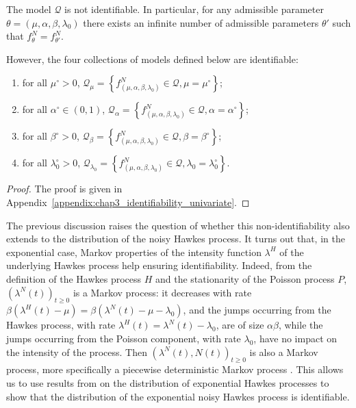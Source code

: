         \begin{proposition}\label{prop:chap3_fixed_univariate_identifiability}
        	The model $\mathcal{Q}$ is not identifiable.
        	In particular, for any admissible parameter $\theta = (\mu, \alpha, \beta, \lambda_0)$ there exists an infinite number of admissible parameters $\theta'$ such that $f_{\theta}^N = f_{\theta'}^N$.
        	
        	However, the four collections of models defined below are identifiable:
          \begin{enumerate}
            \item for all $\mu^\circ > 0$, $\mathcal Q_{\mu} = \left\{ f_{(\mu, \alpha, \beta, \lambda_0)}^N \in \mathcal Q, \mu = \mu^\circ \right\}$;
            \item for all $\alpha^\circ \in (0, 1)$, $\mathcal Q_{\alpha} = \left\{ f_{(\mu, \alpha, \beta, \lambda_0)}^N \in \mathcal Q, \alpha = \alpha^\circ \right\}$;
            \item for all $\beta^\circ > 0$, $\mathcal Q_{\beta} = \left\{ f_{(\mu, \alpha, \beta, \lambda_0)}^N \in \mathcal Q, \beta = \beta^\circ \right\}$;
            \item for all $\lambda_0^\circ > 0$, $\mathcal Q_{\lambda_0} = \left\{ f_{(\mu, \alpha, \beta, \lambda_0)}^N \in \mathcal Q, \lambda_0 = \lambda_0^\circ \right\}$.
          \end{enumerate}
        \end{proposition}
        \begin{proof}
	        The proof is given in Appendix~\ref{appendix:chap3_identifiability_univariate}.
        \end{proof}
        
        The previous discussion raises the question of whether this non-identifiability also extends to the distribution of the noisy Hawkes process.
It turns out that, in the exponential case, Markov properties of the intensity function $\lambda^H$ of the underlying Hawkes process help ensuring identifiability.
Indeed, from the definition of the Hawkes process $H$ and the stationarity of the Poisson process $P$, $\left( \lambda^N(t) \right)_{t \ge 0}$ is a Markov process: it decreases with rate $\beta(\lambda^H(t) - \mu) = \beta (\lambda^N(t) - \mu - \lambda_0)$, and the jumps occurring from the Hawkes process, with rate $\lambda^H(t) = \lambda^N(t) - \lambda_0$, are of size $\alpha \beta$, while the jumps occurring from the Poisson component, with rate $\lambda_0$, have no impact on the intensity of the process. 
Then $\left( \lambda^N(t), N(t) \right)_{t \ge 0}$ is also a Markov process, more specifically a piecewise deterministic Markov process \parencite{Davis1984}.
This allows us to use results from \textcite{Dassios2011} on the distribution of exponential Hawkes processes to show that the distribution of the exponential noisy Hawkes process is identifiable. 

